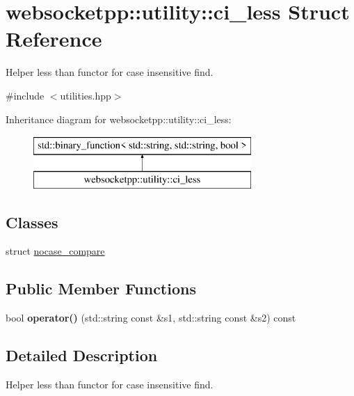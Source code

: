 \hypertarget{structwebsocketpp_1_1utility_1_1ci__less}{}\section{websocketpp\+:\+:utility\+:\+:ci\+\_\+less Struct Reference}
\label{structwebsocketpp_1_1utility_1_1ci__less}


Helper less than functor for case insensitive find.  




{\ttfamily \#include $<$utilities.\+hpp$>$}

Inheritance diagram for websocketpp\+:\+:utility\+:\+:ci\+\_\+less\+:\begin{figure}[H]
\begin{center}
\leavevmode
\includegraphics[height=2.000000cm]{structwebsocketpp_1_1utility_1_1ci__less}
\end{center}
\end{figure}
\subsection*{Classes}
\begin{DoxyCompactItemize}
\item 
struct \hyperlink{structwebsocketpp_1_1utility_1_1ci__less_1_1nocase__compare}{nocase\+\_\+compare}
\end{DoxyCompactItemize}
\subsection*{Public Member Functions}
\begin{DoxyCompactItemize}
\item 
bool {\bfseries operator()} (std\+::string const \&s1, std\+::string const \&s2) const\hypertarget{structwebsocketpp_1_1utility_1_1ci__less_a6b5354059eb2da0ecb7eb11afa6d8b54}{}\label{structwebsocketpp_1_1utility_1_1ci__less_a6b5354059eb2da0ecb7eb11afa6d8b54}

\end{DoxyCompactItemize}


\subsection{Detailed Description}
Helper less than functor for case insensitive find. 

